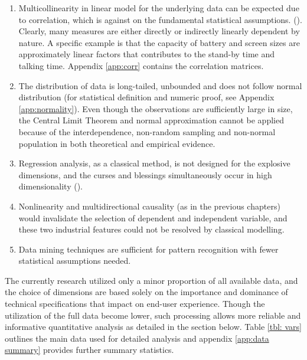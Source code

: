 \documentclass[utf8,english]{gradu3}
\begin{document}
\begin{enumerate}
    \item Multicollinearity in linear model for the underlying data can be expected due to correlation, which is against on the fundamental statistical assumptions. (\cite{farrar1967multicollinearity}). Clearly, many measures are either directly or indirectly linearly dependent by nature. A specific example is that the capacity of battery and screen sizes are approximately linear factors that contributes to the stand-by time and talking time. Appendix \ref{app:corr} contains the correlation matrices.
    \item The distribution of data is long-tailed, unbounded and does not follow normal distribution (for statistical definition and numeric proof, see Appendix \ref{app:normality}). Even though the observations are sufficiently large in size, the Central Limit Theorem and normal approximation cannot be applied because of the interdependence, non-random sampling and non-normal population in both theoretical and empirical evidence.
    \item Regression analysis, as a classical method, is not designed for the explosive dimensions, and the curses and blessings simultaneously occur in high dimensionality (\cite{donoho2000high}).
    \item Nonlinearity and multidirectional causality (as in the previous chapters) would invalidate the selection of dependent and independent variable, and these two industrial features could not be resolved by classical modelling.
    \item Data mining techniques are sufficient for pattern recognition with fewer statistical assumptions needed.
\end{enumerate}

The currently research utilized only a minor proportion of all available data, and the choice of dimensions are based solely on the importance and dominance of technical specifications that impact on end-user experience. Though the utilization of the full data become lower, such processing allows more reliable and informative quantitative analysis as detailed in the section below. Table \ref{tbl: vars} outlines the main data used for detailed analysis and appendix \ref{app:data summary} provides further summary statistics.
\end{document}
